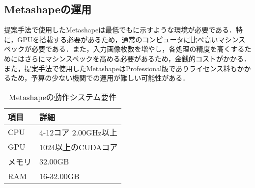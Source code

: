     \subsection*{Metashapeの運用}
      提案手法で使用したMetashapeは最低でもに示すような環境が必要である．特に，GPUを搭載する必要があるため，通常のコンピュータに比べ高いマシンスペックが必要である．また，入力画像枚数を増やし，各処理の精度を高くするためにはさらにマシンスペックを高める必要があるため，金銭的コストがかかる．また，提案手法で使用したMetashapeはProfessional版でありライセンス料もかかるため，予算の少ない機関での運用が難しい可能性がある．
      
      \begin{table}[tbp]
        \centering
        \caption{Metashapeの動作システム要件}
        \label{Metashapeの動作システム要件}
        \begin{tabular}{ll}
          \hline
          \textbf{項目} & \textbf{詳細} \\
          \hline \hline
          CPU & 4-12コア 2.00GHz以上 \\
          GPU & 1024以上のCUDAコア \\
          メモリ & 32.00GB \\
          RAM & 16-32.00GB \\ \hline
        \end{tabular}
      \end{table}
